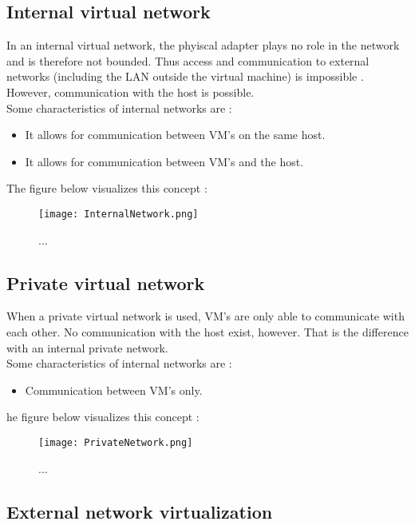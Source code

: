 \subsection{Internal virtual network}

In an internal virtual network, the phyiscal adapter plays no role in the network and is therefore not bounded. Thus access and communication to external networks (including the LAN outside the virtual machine) is impossible \citep{HyperVNetworking1, HyperVNetworking3}. However, communication with the host is possible. \\
Some characteristics of internal networks are \citep{HyperVNetworking2}:
\begin{itemize}
\item It allows for communication between VM's on the same host.
\item It allows for communication between VM's and the host.
\end{itemize}
The figure below visualizes this concept \citep{HyperVNetworking2}:
\begin{figure}[h]
    \centering
    \texttt{[image: InternalNetwork.png]}
    \caption[Internal Virtual Network]{...}
\end{figure}

\subsection{Private virtual network}

When a private virtual network is used, VM's are only able to communicate with each other. No communication with the host exist, however. That is the difference with an internal private network. \\
Some characteristics of internal networks are \citep{HyperVNetworking2}:
\begin{itemize}
\item Communication between VM's only.
\end{itemize}
he figure below visualizes this concept \citep{HyperVNetworking2}:
\begin{figure}[h]
    \centering
    \texttt{[image: PrivateNetwork.png]}
    \caption[Private Virtual Network]{...}
\end{figure}

\subsection{External network virtualization}

